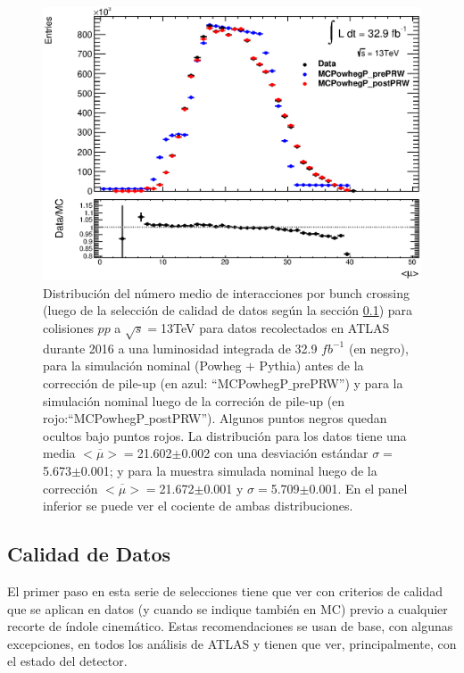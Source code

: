 \begin{figure}[ht]
    \centering
    \includegraphics[width =0.9\linewidth]{images/Final_AvgMu}
    \caption{Distribución del número medio de interacciones por bunch crossing (luego de la selección de calidad de datos según la sección \ref{DataQu}) para colisiones $pp$ a $\sqrt{s}=$13TeV para datos recolectados en ATLAS durante 2016 a una luminosidad integrada de 32.9 $fb^{-1}$ (en negro), para la simulación nominal (Powheg $+$ Pythia) antes de la corrección de pile-up (en azul: ``MCPowhegP$\_$prePRW'') y para la simulación nominal luego de la correción de pile-up (en rojo:``MCPowhegP$\_$postPRW''). Algunos puntos negros quedan ocultos bajo puntos rojos. La distribución para los datos tiene una media $\overline{<\mu>}=$21.602$\pm$0.002 con una desviación estándar $\sigma=$5.673$\pm$0.001; y para la muestra simulada nominal luego de la corrección $\overline{<\mu>}=$21.672$\pm$0.001 y $\sigma=$5.709$\pm$0.001. En el panel inferior se puede ver el cociente de ambas distribuciones.}
    \label{fig:avgmu}
\end{figure}

\subsection{Calidad de Datos} \label{DataQu}

El primer paso en esta serie de selecciones tiene que ver con criterios de calidad que se aplican en datos (y cuando se indique también en MC) previo a cualquier recorte de índole cinemático. Estas recomendaciones se usan de base, con algunas excepciones, en todos los análisis de ATLAS y tienen que ver, principalmente, con el estado del detector. 

